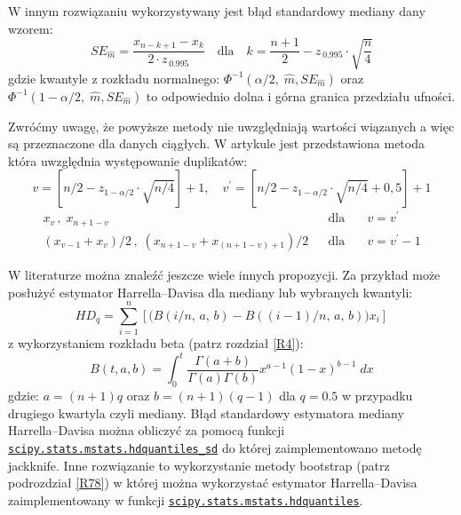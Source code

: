 \documentclass[polish,]{book}
\begin{document}
W innym rozwiązaniu \citep{ms1984} wykorzystywany jest błąd standardowy mediany dany wzorem:
\begin{equation}
SE_{\hat{m}}=\frac{x_{n-k+1}-x_{k}}{2\cdot z_{\,0.995}}\quad \mathrm{dla}\quad k=\frac{n+1}{2}-z_{\,0.995}\cdot\sqrt{\frac{n}{4}}
\label{eq:se05}
\end{equation}
gdzie kwantyle z rozkładu normalnego: \(\Phi^{-1}(\alpha/2,\;\hat{m},SE_{\hat{m}})\) oraz \(\Phi^{-1}(1-\alpha/2,\;\hat{m},SE_{\hat{m}})\)
to odpowiednio dolna i górna granica przedziału ufności.

Zwróćmy uwagę, że powyższe metody nie uwzględniają wartości wiązanych a więc są przeznaczone dla danych ciągłych. W artykule \citep{iwasaki2005} jest przedstawiona metoda która uwzględnia występowanie duplikatów:
\begin{equation}
v=\left[n/2-z_{1-\alpha/2}\cdot \sqrt{n/4}\right]+1,\quad v^{\prime}=\left[n/2-z_{1-\alpha/2}\cdot\sqrt{n/4}+0,5\right]+1
\label{eq:se06}
\end{equation}
\begin{equation}
\begin{aligned}
x_{v}\,,\;x_{n+1-v}
&
&
\textrm{dla}\quad
&
v=v^{\prime}\\[0.0in]
(x_{v-1}+x_{v})/2\,,\;(x_{n+1-v}+x_{(n+1-v)+1})/2
&
&
\textrm{dla}\quad
&
v=v^{\prime}-1
\end{aligned}
\label{eq:se07}
\end{equation}

W literaturze \citep{wilcox2017} można znaleźć jeszcze wiele innych propozycji. Za przykład może posłużyć estymator Harrella--Davisa \citep{hd1982} dla mediany lub wybranych kwantyli:
\begin{equation}
HD_{q}=\sum_{i=1}^{n}\left[\Big(B(i/n,\,a,\,b)-B((i-1)/n,\,a,\,b)\Bigr)x_{i}\right]
\label{eq:se08}
\end{equation}
z wykorzystaniem rozkładu beta (patrz rozdział \ref{R4}):
\begin{equation}
B(t,a,b)=\int_{0}^{t}\frac{\Gamma(a+b)}{\Gamma(a)\Gamma(b)}x^{a-1}(1-x)^{b-1}\;dx
\label{eq:se09}
\end{equation}
gdzie: \(a=(n+1)q\) oraz \(b=(n+1)(q-1)\) dla \(q=0.5\) w przypadku drugiego kwartyla czyli mediany.
Błąd standardowy estymatora mediany Harrella--Davisa można obliczyć za pomocą funkcji \href{https://docs.scipy.org/doc/scipy/reference/generated/scipy.stats.mstats.hdquantiles_sd.html\#scipy.stats.mstats.hdquantiles_sd}{\texttt{scipy.stats.mstats.hdquantiles\_sd}} do której zaimplementowano metodę jackknife. Inne rozwiązanie to wykorzystanie metody bootstrap (patrz podrozdział \ref{R78}) w której można wykorzystać estymator Harrella--Davisa zaimplementowany w funkcji \href{https://docs.scipy.org/doc/scipy/reference/generated/scipy.stats.mstats.hdquantiles.html}{\texttt{scipy.stats.mstats.hdquantiles}}.
\end{document}
